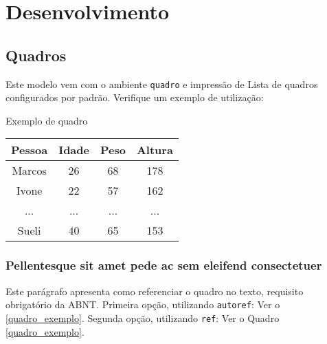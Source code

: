 \chapter{Desenvolvimento}

\section{Quadros}

Este modelo vem com o ambiente \texttt{quadro} e impressão de Lista de quadros 
configurados por padrão. Verifique um exemplo de utilização:

\begin{quadro}[htb]
    \caption{\label{quadro_exemplo}Exemplo de quadro}
    \begin{tabular}{|c|c|c|c|}
        \hline
        \textbf{Pessoa} & \textbf{Idade} & \textbf{Peso} & \textbf{Altura} \\ \hline
        Marcos & 26    & 68   & 178    \\ \hline
        Ivone  & 22    & 57   & 162    \\ \hline
        ...    & ...   & ...  & ...    \\ \hline
        Sueli  & 40    & 65   & 153    \\ \hline
    \end{tabular}
\end{quadro}

\subsection{Pellentesque sit amet pede ac sem eleifend consectetuer}
Este parágrafo apresenta como referenciar o quadro no texto, requisito
obrigatório da ABNT. 
Primeira opção, utilizando \texttt{autoref}: Ver o \autoref{quadro_exemplo}. 
Segunda opção, utilizando  \texttt{ref}: Ver o Quadro \ref{quadro_exemplo}.